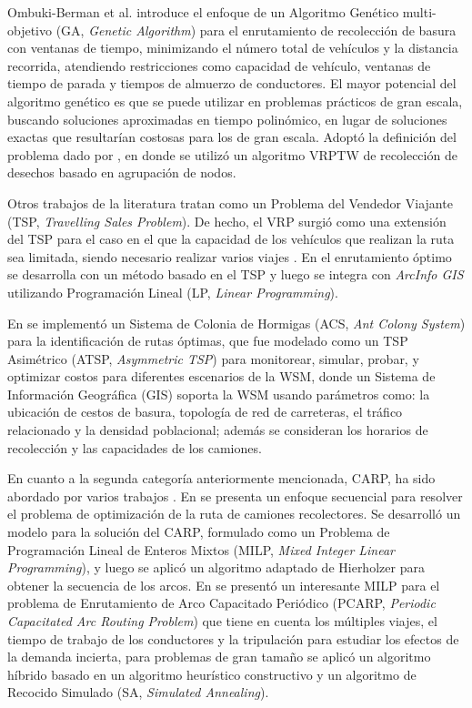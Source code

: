 \documentclass[spanish, conference]{IEEEtran}
\begin{document}
Ombuki-Berman et al. \cite{Ombuki-Berman2007WASTEALGORITHMS} introduce el enfoque de un Algoritmo Genético multi-objetivo (GA, \textit{Genetic Algorithm}) para el enrutamiento de recolección de basura con ventanas de tiempo, minimizando el número total de vehículos y la distancia recorrida, atendiendo restricciones como capacidad de vehículo, ventanas de tiempo de parada y tiempos de almuerzo de conductores. El mayor potencial del algoritmo genético es que se puede utilizar en problemas prácticos de gran escala, buscando soluciones aproximadas en tiempo polinómico, en lugar de soluciones exactas que resultarían costosas para los de gran escala. Adoptó la definición del problema dado por \cite{Kim2006WasteWindows}, en donde se utilizó un algoritmo VRPTW de recolección de desechos basado en agrupación de nodos.

Otros trabajos de la literatura tratan como un Problema del Vendedor Viajante (TSP, \textit{Travelling Sales Problem}). De hecho, el VRP surgió como una extensión del TSP para el caso en el que la capacidad de los vehículos que realizan la ruta sea limitada, siendo necesario realizar varios viajes \cite{CalvinoM2011CooperacionPanoramica}. En \cite{Billa2014GISOptimization} el enrutamiento óptimo se desarrolla con un método basado en el TSP y luego se integra con \textit{ArcInfo GIS} utilizando Programación Lineal (LP, \textit{Linear Programming}).

En \cite{Karadimas2007OptimalAlgorithm} se implementó un Sistema de Colonia de Hormigas (ACS, \textit{Ant Colony System}) para la identificación de rutas óptimas, que fue modelado como un TSP Asimétrico (ATSP, \textit{Asymmetric TSP}) para monitorear, simular, probar, y optimizar costos para diferentes escenarios de la WSM, donde un Sistema de Información Geográfica (GIS) soporta la WSM usando parámetros como: la ubicación de cestos de basura, topología de red de carreteras, el tráfico relacionado y la densidad poblacional; además se consideran los horarios de recolección y las capacidades de los camiones.

En cuanto a la segunda categoría anteriormente mencionada, CARP, ha sido abordado por varios trabajos \cite{Vecchi2016ACollection,Tirkolaee2018ATime,Braier2017AnArgentina}. En \cite{Vecchi2016ACollection} se presenta un enfoque secuencial para resolver el problema de optimización de la ruta de camiones recolectores. Se desarrolló un modelo para la solución del CARP, formulado como un Problema de Programación Lineal de Enteros Mixtos (MILP, \textit{Mixed Integer Linear Programming}), y luego se aplicó un algoritmo adaptado de Hierholzer para obtener la secuencia de los arcos. En \cite{Tirkolaee2018ATime} se presentó un interesante MILP para el problema de Enrutamiento de Arco Capacitado Periódico (PCARP, \textit{Periodic Capacitated Arc Routing Problem}) que tiene en cuenta los múltiples viajes, el tiempo de trabajo de los conductores y la tripulación para estudiar los efectos de la demanda incierta, para problemas de gran tamaño se aplicó un algoritmo híbrido basado en un algoritmo heurístico constructivo y un algoritmo de Recocido Simulado (SA, \textit{Simulated Annealing}).
\end{document}
